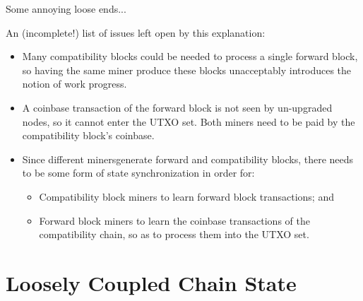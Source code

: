 \documentclass[10pt]{beamer}
\begin{document}
\begin{frame}{Some annoying loose ends...}

  An (incomplete!) list of issues left open by this explanation:

  \begin{itemize}

  \item Many compatibility blocks could be needed to process a single
    forward block, so having the same miner produce these blocks
    unacceptably introduces the notion of work progress.

  \item A coinbase transaction of the forward block is not seen by
    un-upgraded nodes, so it cannot enter the UTXO set.  Both miners
    need to be paid by the compatibility block's coinbase.

  \item Since different miners\footnotemark generate forward and
    compatibility blocks, there needs to be some form of state
    synchronization in order for:


    \begin{itemize}

    \item Compatibility block miners to learn forward block
      transactions; and

    \item Forward block miners to learn the coinbase transactions of
      the compatibility chain, so as to process them into the UTXO
      set.

    \end{itemize}

  \end{itemize}

\end{frame}

\section{Loosely Coupled Chain State}
\end{document}

